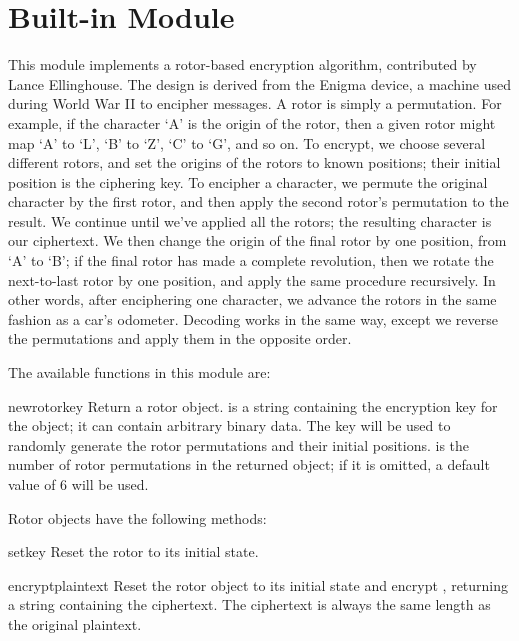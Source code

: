 \section{Built-in Module }

This module implements a rotor-based encryption algorithm, contributed by
Lance Ellinghouse.  The design is derived from the Enigma device, a machine
used during World War II to encipher messages.  A rotor is simply a
permutation.  For example, if the character `A' is the origin of the rotor,
then a given rotor might map `A' to `L', `B' to `Z', `C' to `G', and so on.
To encrypt, we choose several different rotors, and set the origins of the
rotors to known positions; their initial position is the ciphering key.  To
encipher a character, we permute the original character by the first rotor,
and then apply the second rotor's permutation to the result. We continue
until we've applied all the rotors; the resulting character is our
ciphertext.  We then change the origin of the final rotor by one position,
from `A' to `B'; if the final rotor has made a complete revolution, then we
rotate the next-to-last rotor by one position, and apply the same procedure
recursively.  In other words, after enciphering one character, we advance
the rotors in the same fashion as a car's odometer. Decoding works in the
same way, except we reverse the permutations and apply them in the opposite
order.

The available functions in this module are:

\renewcommand{\indexsubitem}{(in module rotor)}
\begin{funcdesc}{newrotor}{key}
Return a rotor object.  is a string containing the encryption key
for the object; it can contain arbitrary binary data. The key will be used
to randomly generate the rotor permutations and their initial positions.
 is the number of rotor permutations in the returned object;
if it is omitted, a default value of 6 will be used.
\end{funcdesc}

Rotor objects have the following methods:

\renewcommand{\indexsubitem}{(rotor method)}
\begin{funcdesc}{setkey}{}
Reset the rotor to its initial state.
\end{funcdesc}

\begin{funcdesc}{encrypt}{plaintext}
Reset the rotor object to its initial state and encrypt ,
returning a string containing the ciphertext.  The ciphertext is always the
same length as the original plaintext.
\end{funcdesc}

